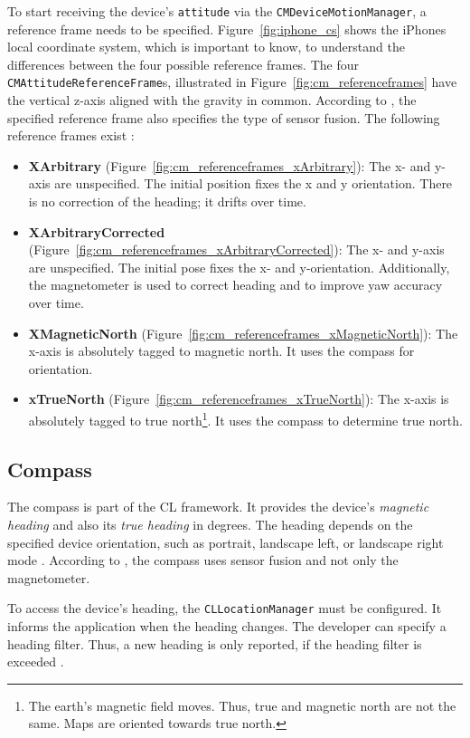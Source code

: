 To start receiving the device's \texttt{attitude} via the \texttt{CMDeviceMotionManager}, a reference frame needs to be specified. Figure~\ref{fig:iphone_cs} shows the iPhones local coordinate system, which is important to know, to understand the differences between the four possible reference frames. The four \texttt{CMAttitudeReferenceFrame}s, illustrated in Figure~\ref{fig:cm_referenceframes} have the vertical z-axis aligned with the gravity in common. According to \citet{apple:wwdc_2012_pham}, the specified reference frame also specifies the type of sensor fusion. The following reference frames exist \citep{apple:wwdc_2012_pham,apple:ios_doc_cm}:
\begin{itemize}
  \item \textbf{XArbitrary} (Figure~\ref{fig:cm_referenceframes_xArbitrary}): The x- and y-axis are unspecified. The initial position fixes the x and y orientation. There is no correction of the heading; it drifts over time.
  \item \textbf{XArbitraryCorrected} (Figure~\ref{fig:cm_referenceframes_xArbitraryCorrected}): The x- and y-axis are unspecified. The initial pose fixes the x- and y-orientation. Additionally, the magnetometer is used to correct heading and to improve yaw accuracy over time.
  \item \textbf{XMagneticNorth} (Figure~\ref{fig:cm_referenceframes_xMagneticNorth}): The x-axis is absolutely tagged to magnetic north. It uses the compass for orientation.
  \item \textbf{xTrueNorth} (Figure~\ref{fig:cm_referenceframes_xTrueNorth}): The x-axis is absolutely tagged to true north\footnote{The earth's magnetic field moves. Thus, true and magnetic north are not the same. Maps are oriented towards true north.}. It uses the compass to determine true north.
\end{itemize}



\subsection{Compass}
The compass is part of the \ac{CL} framework. It provides the device's \emph{magnetic heading} and also its \emph{true heading} in degrees. The heading depends on the specified device orientation, such as portrait, landscape left, or landscape right mode \citep{apple:ios_doc_cl}. According to \citet{apple:wwdc_2012_pham}, the compass uses sensor fusion and not only the magnetometer.

To access the device's heading, the \texttt{CLLocationManager} must be configured. It informs the application when the heading changes. The developer can specify a heading filter. Thus, a new heading is only reported, if the heading filter is exceeded \citep{apple:ios_doc_cl}.

